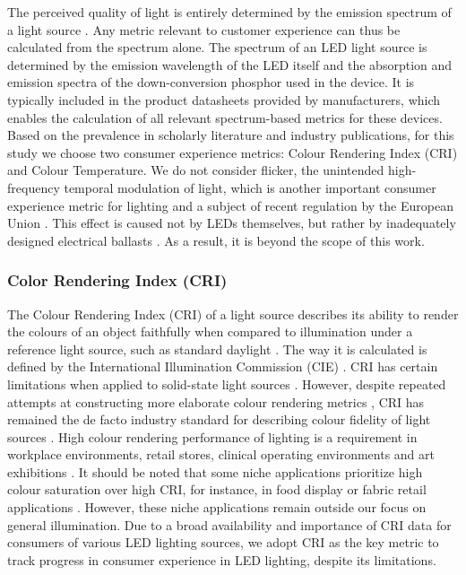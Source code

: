 \documentclass[twoside,twocolumn,9pt]{article}
\begin{document}
The perceived quality of light is entirely determined by the emission spectrum of a light source \cite{ies_handbook}. Any metric relevant to customer experience can thus be calculated from the spectrum alone. The spectrum of an LED light source is determined by the emission wavelength of the LED itself and the absorption and emission spectra  of the down-conversion phosphor used in the device. It is typically included in the product datasheets provided by manufacturers, which enables the calculation of all relevant spectrum-based metrics for these devices. Based on the prevalence in scholarly literature and industry publications, for this study we choose two consumer experience metrics: Colour Rendering Index (CRI) and Colour Temperature. We do not consider flicker, the unintended high-frequency temporal modulation of light, which is another important consumer experience metric for lighting and a subject of recent regulation by the European Union \cite{weinold2020long}. This effect is caused not by LEDs themselves, but rather by inadequately designed electrical ballasts \cite{Lehman2014}. As a result, it is beyond the scope of this work. 

\subsubsection{Color Rendering Index (CRI)}

The Colour Rendering Index (CRI) of a light source describes its ability to render the colours of an object faithfully when compared to illumination under a reference light source, such as standard daylight \cite{khan2015led}. The way it is calculated is defined by the International Illumination Commission (CIE) \cite{cie_cri_1995}. CRI has certain limitations when applied to solid-state light sources \cite{david2013cri}. However, despite repeated attempts at constructing more elaborate colour rendering metrics \cite{Houser2013}, CRI has remained the de facto industry standard for describing colour fidelity of light sources \cite{DOE2016LED}. High colour rendering performance of lighting is a requirement in workplace environments, retail stores, clinical operating environments and art exhibitions \cite{khanh2017color}. It should be noted that some niche applications prioritize high colour saturation over high CRI, for instance, in food display or fabric retail applications \cite{david2013cri}. However, these niche applications remain outside our focus on general illumination. Due to a broad availability and importance of CRI data for consumers of various LED lighting sources, we adopt CRI as the key metric to track progress in consumer experience in LED lighting, despite its limitations. 
\end{document}
